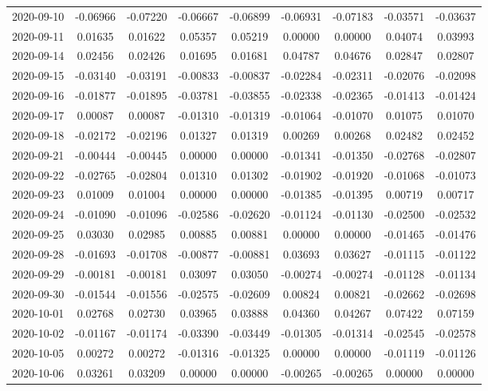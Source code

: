 \begin{footnotesize}
\begin{longtable}{lcccccccc}
2020-09-10 & -0.06966 & -0.07220 & -0.06667 & -0.06899 & -0.06931 & -0.07183 & -0.03571 & -0.03637 \\
2020-09-11 & 0.01635 & 0.01622 & 0.05357 & 0.05219 & 0.00000 & 0.00000 & 0.04074 & 0.03993 \\
2020-09-14 & 0.02456 & 0.02426 & 0.01695 & 0.01681 & 0.04787 & 0.04676 & 0.02847 & 0.02807 \\
2020-09-15 & -0.03140 & -0.03191 & -0.00833 & -0.00837 & -0.02284 & -0.02311 & -0.02076 & -0.02098 \\
2020-09-16 & -0.01877 & -0.01895 & -0.03781 & -0.03855 & -0.02338 & -0.02365 & -0.01413 & -0.01424 \\
2020-09-17 & 0.00087 & 0.00087 & -0.01310 & -0.01319 & -0.01064 & -0.01070 & 0.01075 & 0.01070 \\
2020-09-18 & -0.02172 & -0.02196 & 0.01327 & 0.01319 & 0.00269 & 0.00268 & 0.02482 & 0.02452 \\
2020-09-21 & -0.00444 & -0.00445 & 0.00000 & 0.00000 & -0.01341 & -0.01350 & -0.02768 & -0.02807 \\
2020-09-22 & -0.02765 & -0.02804 & 0.01310 & 0.01302 & -0.01902 & -0.01920 & -0.01068 & -0.01073 \\
2020-09-23 & 0.01009 & 0.01004 & 0.00000 & 0.00000 & -0.01385 & -0.01395 & 0.00719 & 0.00717 \\
2020-09-24 & -0.01090 & -0.01096 & -0.02586 & -0.02620 & -0.01124 & -0.01130 & -0.02500 & -0.02532 \\
2020-09-25 & 0.03030 & 0.02985 & 0.00885 & 0.00881 & 0.00000 & 0.00000 & -0.01465 & -0.01476 \\
2020-09-28 & -0.01693 & -0.01708 & -0.00877 & -0.00881 & 0.03693 & 0.03627 & -0.01115 & -0.01122 \\
2020-09-29 & -0.00181 & -0.00181 & 0.03097 & 0.03050 & -0.00274 & -0.00274 & -0.01128 & -0.01134 \\
2020-09-30 & -0.01544 & -0.01556 & -0.02575 & -0.02609 & 0.00824 & 0.00821 & -0.02662 & -0.02698 \\
2020-10-01 & 0.02768 & 0.02730 & 0.03965 & 0.03888 & 0.04360 & 0.04267 & 0.07422 & 0.07159 \\
2020-10-02 & -0.01167 & -0.01174 & -0.03390 & -0.03449 & -0.01305 & -0.01314 & -0.02545 & -0.02578 \\
2020-10-05 & 0.00272 & 0.00272 & -0.01316 & -0.01325 & 0.00000 & 0.00000 & -0.01119 & -0.01126 \\
2020-10-06 & 0.03261 & 0.03209 & 0.00000 & 0.00000 & -0.00265 & -0.00265 & 0.00000 & 0.00000 \\

\end{longtable}
\end{footnotesize}
